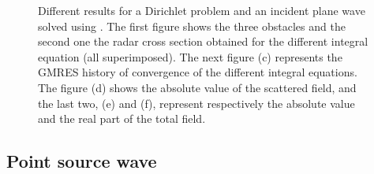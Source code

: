 \begin{figure}
\caption{Different results for a Dirichlet problem and an incident plane wave solved using \mudiff. The first figure shows the three obstacles and the second one the radar cross section obtained for the different integral equation (all superimposed). The next figure (c) represents the GMRES history of convergence of the different integral equations. The figure (d) shows the absolute value of the scattered field, and the last two, (e) and (f), represent respectively the absolute value and the real part of the total field.}
\label{fig:exampleDirichlet}
\end{figure}

\subsection{Point source wave}

